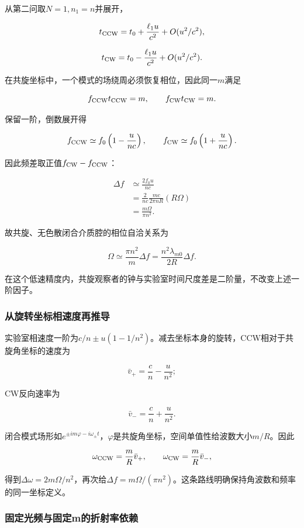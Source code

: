 \documentclass[12pt,a4paper,fontset=fandol]{ctexart}
\begin{document}
从第二问取\(N=1,n_1=n\)并展开，

\[
t_{\rm CCW}=t_0+\frac{\ell_1u}{c^2}+O(u^2/c^2),
\]

\[
t_{\rm CW}=t_0-\frac{\ell_1u}{c^2}+O(u^2/c^2).
\]

在共旋坐标中，一个模式的场绕周必须恢复相位，因此同一\(m\)满足

\[
f_{\rm CCW}t_{\rm CCW}=m,\qquad
f_{\rm CW}t_{\rm CW}=m.
\]

保留一阶，倒数展开得

\[
f_{\rm CCW}
\simeq f_0\left(1-\frac{u}{nc}\right),
\qquad
f_{\rm CW}
\simeq f_0\left(1+\frac{u}{nc}\right).
\]

因此频差取正值\(f_{\rm CW}-f_{\rm CCW}\)：

\[
\begin{aligned}
\Delta f
&\simeq\frac{2f_0u}{nc}\\
&=\frac{2}{nc}\frac{mc}{2\pi nR}(R\Omega)\\
&=\boxed{\frac{m\Omega}{\pi n^2}}.
\end{aligned}
\]

故共旋、无色散闭合介质腔的相位自洽关系为

\[
\boxed{
\Omega\simeq\frac{\pi n^2}{m}\Delta f
=\frac{n^2\lambda_{m0}}{2R}\Delta f}.
\]

在这个低速精度内，共旋观察者的钟与实验室时间尺度差是二阶量，不改变上述一阶因子。

\subsubsection{从旋转坐标相速度再推导}\label{ux4eceux65cbux8f6cux5750ux6807ux76f8ux901fux5ea6ux518dux63a8ux5bfc}

实验室相速度一阶为\(c/n\pm u(1-1/n^2)\)。减去坐标本身的旋转，CCW相对于共旋角坐标的速度为

\[
\bar v_+=\frac cn-\frac{u}{n^2};
\]

CW反向速率为

\[
\bar v_-=\frac cn+\frac{u}{n^2}.
\]

闭合模式场形如\(e^{\pm im\varphi-i\omega_\pm t}\)，\(\varphi\)是共旋角坐标，空间单值性给波数大小\(m/R\)。因此

\[
\omega_{\rm CCW}=\frac mR\bar v_+,\qquad
\omega_{\rm CW}=\frac mR\bar v_-,
\]

得到\(\Delta\omega=2m\Omega/n^2\)，再次给\(\Delta f=m\Omega/(\pi n^2)\)。这条路线明确保持角波数和频率的同一坐标定义。

\subsubsection{固定光频与固定m的折射率依赖}\label{ux56faux5b9aux5149ux9891ux4e0eux56faux5b9amux7684ux6298ux5c04ux7387ux4f9dux8d56}
\end{document}
